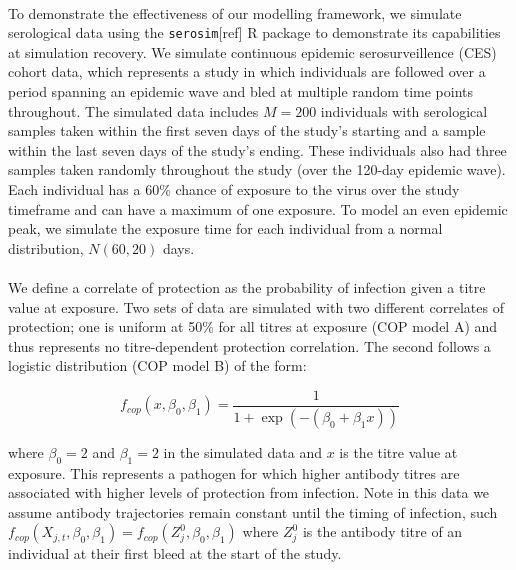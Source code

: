\documentclass{article}
\begin{document}
\paragraph{}To demonstrate the effectiveness of our modelling framework, we simulate serological data using the \texttt{serosim}[ref] R package to demonstrate its capabilities at simulation recovery. We simulate continuous epidemic serosurveillence (CES) cohort data, which represents a study in which individuals are followed over a period spanning an epidemic wave and bled at multiple random time points throughout. The simulated data includes $ M = 200$ individuals with serological samples taken within the first seven days of the study's starting and a sample within the last seven days of the study's ending. These individuals also had three samples taken randomly throughout the study (over the 120-day epidemic wave). Each individual has a 60\% chance of exposure to the virus over the study timeframe and can have a maximum of one exposure. To model an even epidemic peak, we simulate the exposure time for each individual from a normal distribution, $N(60, 20)$ days.%

\paragraph{}We define a correlate of protection as the probability of infection given a titre value at exposure. Two sets of data are simulated with two different correlates of protection; one is uniform at 50\% for all titres at exposure (COP model A) and thus represents no titre-dependent protection correlation. The second follows a logistic distribution (COP model B) of the form:

\begin{equation}
\label{eq_cop}
f_{cop}(x, \beta_0, \beta_1) = \frac{1}{1 + \exp(- (\beta_0 + \beta_1x))}
\end{equation}

where $\beta_0 = 2$ and $\beta_1 = 2$ in the simulated data and $x$ is the titre value at exposure. This represents a pathogen for which higher antibody titres are associated with higher levels of protection from infection. Note in this data we assume antibody trajectories remain constant until the timing of infection, such $f_{cop}(X_{j, t}, \beta_0, \beta_1) = f_{cop}(Z^0_{j}, \beta_0, \beta_1)$ where $Z^0_{j}$ is the antibody titre of an individual at their first bleed at the start of the study.
\end{document}
